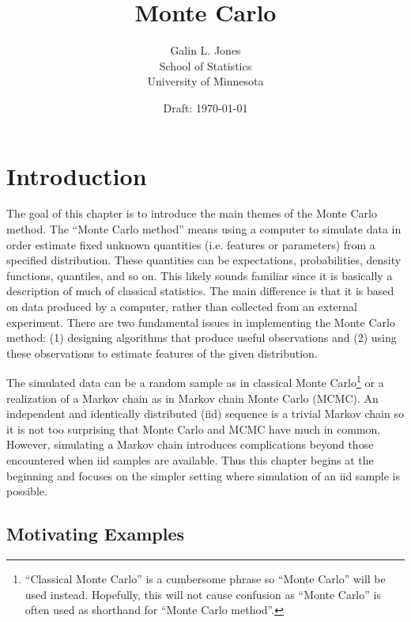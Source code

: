 \documentclass[12pt]{article}
\title{Monte Carlo}
\author{Galin L. Jones\\
{\small School of Statistics}\\
{\small University of Minnesota}}
\date{Draft: \today}
\theoremstyle{plain}
\theoremstyle{definition}
\theoremstyle{remark}
\begin{document}
\maketitle

\tableofcontents

\section{Introduction}
\label{gofmc:sec:intro}

The goal of this chapter is to introduce the main themes of the Monte Carlo 
method.  The ``Monte Carlo method'' means using a computer to
simulate data in order estimate fixed unknown quantities
(i.e. features or parameters) from a specified distribution.  These
quantities can be expectations, probabilities, density functions,
quantiles, and so on. This likely sounds familiar since it is
basically a description of much of classical statistics.  The main
difference is that it is based on data produced by a computer,
rather than collected from an external experiment.  There are two
fundamental issues in implementing the Monte Carlo method: (1)
designing algorithms that produce useful observations and (2) using
these observations to estimate features of the given distribution.

The simulated data can be a random sample as in classical Monte
Carlo\footnote{``Classical Monte Carlo'' is a cumbersome phrase so
  ``Monte Carlo'' will be used instead.  Hopefully, this will not
  cause confusion as ``Monte Carlo'' is often used as shorthand for
  ``Monte Carlo method''.} or a realization of a Markov chain as in
Markov chain Monte Carlo (MCMC).  An independent and identically
distributed (iid) sequence is a trivial Markov chain so it is not too
surprising that Monte Carlo and MCMC have much in common.  However,
simulating a Markov chain introduces complications beyond those
encountered when iid samples are available.  Thus this chapter begins
at the beginning and focuses on the simpler setting where simulation
of an iid sample is possible.

\subsection{Motivating Examples}
\label{gofmc:sec:motivating_examples}
\end{document}
